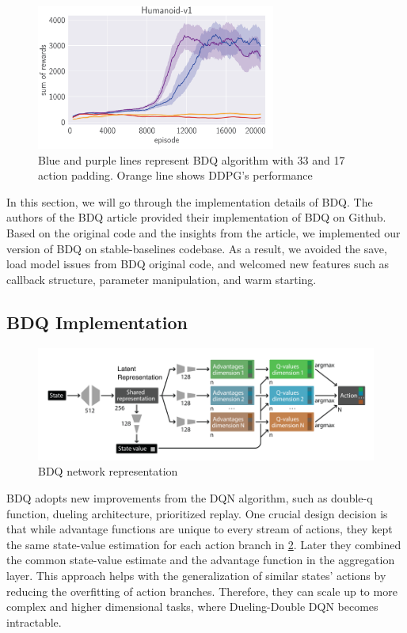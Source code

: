 \begin{figure}[htbp] 
    \centering
    \includegraphics[width=0.7\textwidth]{figures/BDQvsDDPG}
    \caption{Blue and purple lines represent BDQ algorithm with 33 and 17 action padding. Orange line shows DDPG's performance}
    \label{fig:bdqvsddpg}
\end{figure}

In this section, we will go through the implementation details of BDQ. The authors of the BDQ article provided their implementation of BDQ on Github. Based on the original code and the insights from the article, we implemented our version of BDQ on stable-baselines codebase. As a result, we avoided the save, load model issues from BDQ original code, and welcomed new features such as callback structure, parameter manipulation, and warm starting. 


\subsection{BDQ Implementation}


\begin{figure}[htbp] 
    \centering
    \includegraphics[width=1.0\textwidth]{figures/bdq_network.png}
    \caption{BDQ network representation}
    \label{fig:bdq_net}
\end{figure}

BDQ adopts new improvements from the DQN algorithm, such as double-q function, dueling architecture, prioritized replay. One crucial design decision is that while advantage functions are unique to every stream of actions, they kept the same state-value estimation for each action branch in  \ref{fig:bdq_net}. Later they combined the common state-value estimate and the advantage function in the aggregation layer. This approach helps with the generalization of similar states' actions by reducing the overfitting of action branches. Therefore, they can scale up to more complex and higher dimensional tasks, where Dueling-Double DQN becomes intractable.


